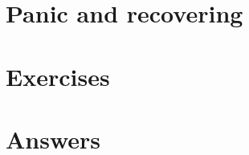 \section{Panic and recovering}
\label{sec:panic}
\todo{}

\section{Exercises}














\cleardoublepage
\section{Answers}
\shipoutAnswer
